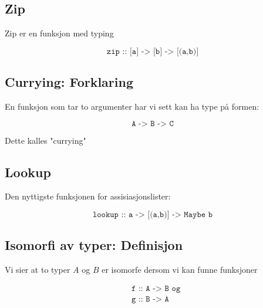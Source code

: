 \documentclass{article}
\begin{document}
    \subsection{Zip}

    Zip er en funksjon med typing

    \[ \texttt{zip :: [a] -> [b] -> [(a,b)]} \]

    \subsection{Currying: Forklaring}

    En funksjon som tar to argumenter har vi sett kan ha type på formen:

    \[ \texttt{A -> B -> C} \]

    Dette kalles "currying" 

    \subsection{Lookup}

    Den nyttigste funksjonen for assisiasjonslister:

    \[ \texttt{lookup :: a -> [(a,b)] -> Maybe b} \]

    \subsection{Isomorfi av typer: Definisjon}
    Vi sier at to typer \( A \) og \( B \) er isomorfe dersom vi kan funne funksjoner

    \begin{align*}
        &\texttt{f :: A -> B og}\\
        &\texttt{g :: B -> A}
    \end{align*}
\end{document}
